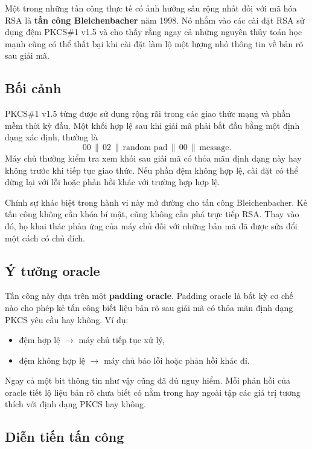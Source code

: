 Một trong những tấn công thực tế có ảnh hưởng sâu rộng nhất đối với mã hóa RSA là \textbf{tấn công Bleichenbacher} năm 1998. Nó nhắm vào các cài đặt RSA sử dụng đệm PKCS\#1 v1.5 và cho thấy rằng ngay cả những nguyên thủy toán học mạnh cũng có thể thất bại khi cài đặt làm lộ một lượng nhỏ thông tin về bản rõ sau giải mã.

\subsection{Bối cảnh}

PKCS\#1 v1.5 từng được sử dụng rộng rãi trong các giao thức mạng và phần mềm thời kỳ đầu. Một khối hợp lệ sau khi giải mã phải bắt đầu bằng một định dạng xác định, thường là
\[
00 \,\|\, 02 \,\|\, \text{random pad} \,\|\, 00 \,\|\, \text{message}.
\]
Máy chủ thường kiểm tra xem khối sau giải mã có thỏa mãn định dạng này hay không trước khi tiếp tục giao thức. Nếu phần đệm không hợp lệ, cài đặt có thể dừng lại với lỗi hoặc phản hồi khác với trường hợp hợp lệ.

Chính sự khác biệt trong hành vi này mở đường cho tấn công Bleichenbacher. Kẻ tấn công không cần khóa bí mật, cũng không cần phá trực tiếp RSA. Thay vào đó, họ khai thác phản ứng của máy chủ đối với những bản mã đã được sửa đổi một cách có chủ đích.

\subsection{Ý tưởng oracle}

Tấn công này dựa trên một \textbf{padding oracle}. Padding oracle là bất kỳ cơ chế nào cho phép kẻ tấn công biết liệu bản rõ sau giải mã có thỏa mãn định dạng PKCS yêu cầu hay không. Ví dụ:

\begin{itemize}
\item đệm hợp lệ $\rightarrow$ máy chủ tiếp tục xử lý,
\item đệm không hợp lệ $\rightarrow$ máy chủ báo lỗi hoặc phản hồi khác đi.
\end{itemize}

Ngay cả một bit thông tin như vậy cũng đã đủ nguy hiểm. Mỗi phản hồi của oracle tiết lộ liệu bản rõ chưa biết có nằm trong hay ngoài tập các giá trị tương thích với định dạng PKCS hay không.

\subsection{Diễn tiến tấn công}

